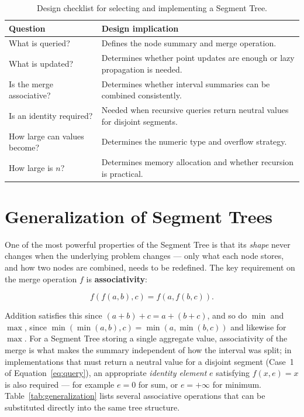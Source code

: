 \documentclass[11pt,open=any]{scrreprt}
\begin{document}
\begin{table}[H]
\centering
\caption{Design checklist for selecting and implementing a Segment Tree.}
\label{tab:checklist}
\begin{tabular}{p{4.2cm}p{8.1cm}}
\toprule
\textbf{Question} & \textbf{Design implication}\\
\midrule
What is queried? & Defines the node summary and merge operation.\\
What is updated? & Determines whether point updates are enough or lazy propagation is needed.\\
Is the merge associative? & Determines whether interval summaries can be combined consistently.\\
Is an identity required? & Needed when recursive queries return neutral values for disjoint segments.\\
How large can values become? & Determines the numeric type and overflow strategy.\\
How large is $n$? & Determines memory allocation and whether recursion is practical.\\
\bottomrule
\end{tabular}
\end{table}

\chapter{Generalization of Segment Trees}
\label{sec:generalization}

One of the most powerful properties of the Segment Tree is that its \emph{shape} never changes when the underlying problem changes --- only what each node stores, and how two nodes are combined, needs to be redefined. The key requirement on the merge operation $f$ is \textbf{associativity}:

\begin{equation}
f(f(a,b),c) = f(a,f(b,c)).
\end{equation}

Addition satisfies this since $(a+b)+c = a+(b+c)$, and so do $\min$ and $\max$, since $\min(\min(a,b),c) = \min(a,\min(b,c))$ and likewise for $\max$. For a Segment Tree storing a single aggregate value, associativity of the merge is what makes the summary independent of how the interval was split; in implementations that must return a neutral value for a disjoint segment (Case~1 of Equation~\eqref{eq:query}), an appropriate \emph{identity element} $e$ satisfying $f(x,e) = x$ is also required --- for example $e = 0$ for sum, or $e = +\infty$ for minimum. Table~\ref{tab:generalization} lists several associative operations that can be substituted directly into the same tree structure.
\end{document}
